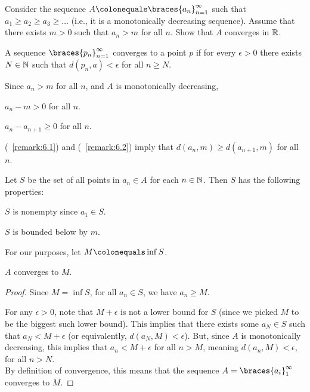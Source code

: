 \begin{problem}
  Consider the sequence $A \colonequals \braces{a_n}_{n=1}^\infty$
  such that $a_1 \geq a_2 \geq a_3 \geq \dots$
  (i.e., it is a monotonically decreasing sequence).
  Assume that there exists $m > 0$ such that
  $a_n > m$ for all $n$.
  Show that $A$ converges in $\mathbb{R}$.
\end{problem}

\begin{answer}
  \begin{definition}
    A sequence $\braces{p_n}_{n=1}^\infty$ converges to a point $p$ if
    for every $\epsilon > 0$ there exists $N \in \mathbb{N}$ such that
    $d(p_n, a) < \epsilon$ for all $n \geq N$.
  \end{definition}
  \begin{remark}
    Since $a_n > m$ for all $n$, and $A$ is monotonically decreasing,
    \begin{enumarabic}
      \item $a_n - m > 0$ for all $n$.~\label{remark:6.1}
      \item $a_n - a_{n+1} \geq 0$ for all $n$.~\label{remark:6.2}
      \item (~\ref{remark:6.1}) and (~\ref{remark:6.2}) imply that
        $d(a_n, m) \geq d(a_{n+1}, m)$ for all $n$.
    \end{enumarabic}
  \end{remark}
  Let $S$ be the set of all points in $a_n \in A$ for each $n \in \mathbb{N}$.
  Then $S$ has the following properties:
  \begin{enumroman}
    \item $S$ is nonempty since $a_1 \in S$.
    \item $S$ is bounded below by $m$.
  \end{enumroman}
  For our purposes, let $M \colonequals \inf S$.
  
  \begin{claim}
    $A$ converges to $M$.

    \begin{proof}
      Since $M = \inf S$, for all $a_n \in S$,
      we have $a_n \geq M$.

      For any $\epsilon > 0$, note that $M + \epsilon$ is not a lower bound for $S$
      (since we picked $M$ to be the biggest such lower bound).
      This implies that there exists some $a_N \in S$ such that $a_N < M + \epsilon$
      (or equivalently, $d(a_N, M) < \epsilon$).
      But, since $A$ is monotonically decreasing, this implies that
      $a_n < M + \epsilon$ for all $n > M$, meaning $d(a_n, M) < \epsilon$, for all $n > N$. \\
      By definition of convergence, this means that the sequence
      $A = \braces{a_i}_1^\infty$ converges to $M$.
    \end{proof}
  \end{claim}
\end{answer}
